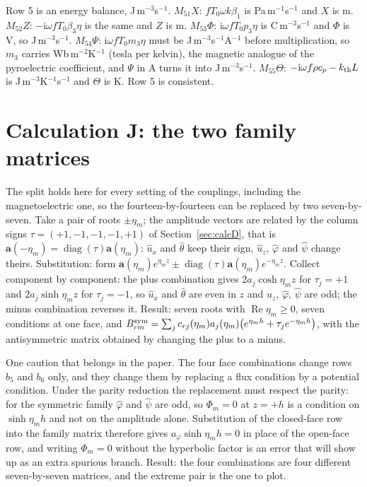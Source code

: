 \documentclass[11pt]{article}
\makeatletter
\newif\ifshowworked
\newenvironment{worked}{%
  \ifshowworked\par\smallskip\noindent\textit{Working.}\par\smallskip\else
  \setbox\z@\vbox\bgroup\fi}{\ifshowworked\par\smallskip\else\egroup\fi}
\newcommand{\ii}{\mathrm{i}}
\makeatother
\begin{document}
\begin{worked}
Row 5 is an energy balance, J\,m$^{-3}$s$^{-1}$. $M_{51}X$: $fT_0\omega k\beta_1$ is
Pa\,m$^{-1}$s$^{-1}$ and $X$ is m. $M_{52}Z$: $-\ii\omega fT_0\beta_3\eta$ is the same and $Z$ is m.
$M_{53}\Phi$: $\ii\omega fT_0p_3\eta$ is C\,m$^{-3}$s$^{-1}$ and $\Phi$ is V, so J\,m$^{-3}$s$^{-1}$.
$M_{54}\Psi$: $\ii\omega fT_0m_3\eta$ must be J\,m$^{-3}$s$^{-1}$A$^{-1}$ before multiplication, so $m_3$
carries Wb\,m$^{-2}$K$^{-1}$ (tesla per kelvin), the magnetic analogue of the pyroelectric coefficient, and $\Psi$
in A turns it into J\,m$^{-3}$s$^{-1}$. $M_{55}\Theta$: $-\ii\omega f\rho c_p-k_{\rm th}L$ is
J\,m$^{-3}$K$^{-1}$s$^{-1}$ and $\Theta$ is K. Row 5 is consistent.
\end{worked}

\section{Calculation J: the two family matrices}

\begin{worked}
The split holds here for every setting of the couplings, including the magnetoelectric one, so the
fourteen-by-fourteen can be replaced by two seven-by-seven. Take a pair of roots $\pm\eta_m$; the amplitude
vectors are related by the column signs $\tau=(+1,-1,-1,-1,+1)$ of Section~\ref{sec:calcD}, that is
$\mathbf a(-\eta_m)=\operatorname{diag}(\tau)\mathbf a(\eta_m)$: $\hat u_x$ and $\hat\theta$ keep their
sign, $\hat u_z$, $\hat\varphi$ and $\hat\psi$ change theirs.
Substitution: form $\mathbf a(\eta_m)e^{\eta_mz}\pm\operatorname{diag}(\tau)\mathbf a(\eta_m)e^{-\eta_mz}$.
Collect component by component: the plus combination gives $2a_j\cosh\eta_mz$ for $\tau_j=+1$ and
$2a_j\sinh\eta_mz$ for $\tau_j=-1$, so $\hat u_x$ and $\hat\theta$ are even in $z$ and $\hat u_z$,
$\hat\varphi$, $\hat\psi$ are odd; the minus combination reverses it.
Result: seven roots with $\operatorname{Re}\eta_m\ge0$, seven conditions at one face, and
$B^{\rm sym}_{rm}=\sum_j c_{rj}(\eta_m)a_j(\eta_m)\bigl(e^{\eta_mh}+\tau_je^{-\eta_mh}\bigr)$, with the
antisymmetric matrix obtained by changing the plus to a minus.
\end{worked}

\begin{worked}
One caution that belongs in the paper. The four face combinations change rows $b_5$ and $b_6$ only, and
they change them by replacing a flux condition by a potential condition. Under the parity reduction the
replacement must respect the parity: for the symmetric family $\hat\varphi$ and $\hat\psi$ are odd, so
$\Phi_m=0$ at $z=+h$ is a condition on $\sinh\eta_mh$ and not on the amplitude alone. Substitution of the
closed-face row into the family matrix therefore gives $a_\varphi\sinh\eta_mh=0$ in place of the open-face
row, and writing $\Phi_m=0$ without the hyperbolic factor is an error that will show up as an extra
spurious branch. Result: the four combinations are four different seven-by-seven matrices, and the extreme
pair is the one to plot.
\end{worked}
\end{document}

